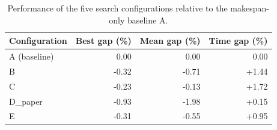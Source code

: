 \begin{table}[t]
\centering
\caption{Performance of the five search configurations relative to the makespan-only baseline A.}
\label{tab:table8-scoring-configurations}
\begin{tabular}{lrrr}
\hline
Configuration & Best gap (\%) & Mean gap (\%) & Time gap (\%) \\
\hline
A (baseline) & 0.00 & 0.00 & 0.00 \\
B & -0.32 & -0.71 & +1.44 \\
C & -0.23 & -0.13 & +1.72 \\
D\_paper & -0.93 & -1.98 & +0.15 \\
E & -0.31 & -0.55 & +0.95 \\
\hline
\end{tabular}
\par{}
\end{table}

